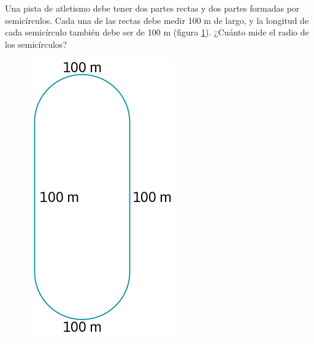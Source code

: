 \documentclass[11pt]{book}
\begin{document}
\begin{enumerate}
        \begin{minipage}[t]{0.7\textwidth}
          \item Una pista de atletismo debe tener dos partes rectas y dos partes formadas por
          semicírculos. Cada una de las rectas debe medir 100 m de largo, y la longitud de
          cada semicírculo también debe ser de 100 m (figura \ref{fig:pista}). ¿Cuánto mide el radio de los semicírculos?
        \end{minipage}\hfill
        \begin{minipage}[t]{0.2\textwidth}
          \begin{figure}[H]
            \centering
            \includegraphics[width=\linewidth]{pista.png}
            \label{fig:pista}
          \end{figure}
        \end{minipage}


\end{enumerate}
\end{document}
